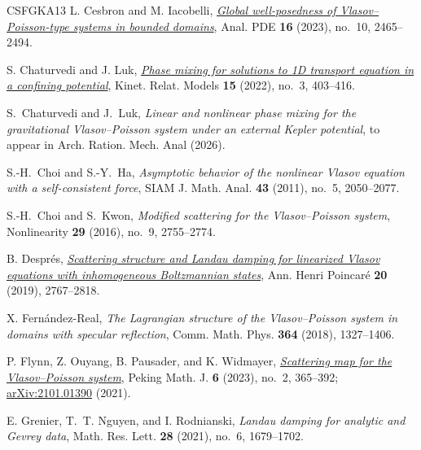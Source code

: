 \documentclass[10pt,reqno]{amsart}
\theoremstyle{definition}
\begin{document}
{\begin{thebibliography}{CSFGKA13}
L. Cesbron and M. Iacobelli,
\href{https://doi.org/10.2140/apde.2023.16.2465}{\emph{Global well-posedness of Vlasov--Poisson-type systems in bounded domains}},
Anal. PDE \textbf{16} (2023), no.~10, 2465--2494.




S. Chaturvedi and J. Luk,
\href{https://www.aimsciences.org/article/doi/10.3934/krm.2022002}{\emph{Phase mixing for solutions to 1D transport equation in a confining potential}},
Kinet. Relat. Models \textbf{15} (2022), no.~3, 403--416.

S.~Chaturvedi and J.~Luk,
\emph{Linear and nonlinear phase mixing for the gravitational Vlasov--Poisson system under an external Kepler potential},
to appear in Arch. Ration. Mech. Anal (2026).

S.-H.~Choi and S.-Y.~Ha,
\emph{Asymptotic behavior of the nonlinear Vlasov equation with a self-consistent force},
SIAM J. Math. Anal. \textbf{43} (2011), no.~5, 2050--2077.



S.-H.~Choi and S.~Kwon,
\emph{Modified scattering for the Vlasov--Poisson system},
Nonlinearity \textbf{29} (2016), no.~9, 2755--2774.





B. Despr\'es,
\href{https://hal.sorbonne-universite.fr/hal-01985113v1/document}{\emph{Scattering structure and Landau damping for linearized Vlasov equations with inhomogeneous Boltzmannian states}},
Ann. Henri Poincar\'e \textbf{20} (2019), 2767--2818.



X. Fern\'andez-Real,
\emph{The Lagrangian structure of the Vlasov--Poisson system in domains with specular reflection},
Comm. Math. Phys. \textbf{364} (2018), 1327--1406.

P. Flynn, Z. Ouyang, B. Pausader, and K. Widmayer,
\href{https://doi.org/10.1007/s42543-021-00041-x}{\emph{Scattering map for the Vlasov--Poisson system}},
Peking Math. J. \textbf{6} (2023), no.~2, 365--392; \href{https://arxiv.org/abs/2101.01390}{arXiv:2101.01390} (2021).





E. Grenier, T.~T. Nguyen, and I. Rodnianski,
\emph{Landau damping for analytic and Gevrey data},
Math. Res. Lett. \textbf{28} (2021), no.~6, 1679--1702.



\end{thebibliography}}
\end{document}
